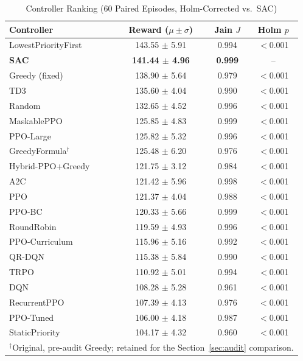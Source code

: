 \documentclass[9pt,conference]{IEEEtran}
\begin{document}
\begin{table}[tbp]
\caption{Controller Ranking (60 Paired Episodes, Holm-Corrected vs.\ SAC)}
\label{tab:ranking}
\begin{center}
\scriptsize
\begin{tabular}{|l|c|c|c|}
\hline
\textbf{Controller} & \textbf{Reward ($\mu\pm\sigma$)} & \textbf{Jain $J$} & \textbf{Holm $p$} \\
\hline
LowestPriorityFirst & 143.55 $\pm$ 5.91 & 0.994 & $<$0.001 \\
\textbf{SAC} & \textbf{141.44 $\pm$ 4.96} & \textbf{0.999} & -- \\
Greedy (fixed) & 138.90 $\pm$ 5.64 & 0.979 & $<$0.001 \\
TD3 & 135.60 $\pm$ 4.04 & 0.990 & $<$0.001 \\
Random & 132.65 $\pm$ 4.52 & 0.996 & $<$0.001 \\
MaskablePPO & 125.85 $\pm$ 4.83 & 0.999 & $<$0.001 \\
PPO-Large & 125.82 $\pm$ 5.32 & 0.996 & $<$0.001 \\
GreedyFormula$^\dagger$ & 125.48 $\pm$ 6.20 & 0.976 & $<$0.001 \\
Hybrid-PPO+Greedy & 121.75 $\pm$ 3.12 & 0.984 & $<$0.001 \\
A2C & 121.42 $\pm$ 5.96 & 0.998 & $<$0.001 \\
PPO & 121.37 $\pm$ 4.04 & 0.988 & $<$0.001 \\
PPO-BC & 120.33 $\pm$ 5.66 & 0.999 & $<$0.001 \\
RoundRobin & 119.59 $\pm$ 4.93 & 0.996 & $<$0.001 \\
PPO-Curriculum & 115.96 $\pm$ 5.16 & 0.992 & $<$0.001 \\
QR-DQN & 115.38 $\pm$ 5.84 & 0.990 & $<$0.001 \\
TRPO & 110.92 $\pm$ 5.01 & 0.994 & $<$0.001 \\
DQN & 108.28 $\pm$ 5.28 & 0.961 & $<$0.001 \\
RecurrentPPO & 107.39 $\pm$ 4.13 & 0.976 & $<$0.001 \\
PPO-Tuned & 106.00 $\pm$ 4.18 & 0.987 & $<$0.001 \\
StaticPriority & 104.17 $\pm$ 4.32 & 0.960 & $<$0.001 \\
\hline
\multicolumn{4}{l}{\scriptsize $^\dagger$Original, pre-audit Greedy; retained for the Section~\ref{sec:audit} comparison.}
\end{tabular}
\end{center}
\end{table}
\end{document}
